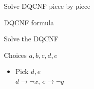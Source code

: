 \documentclass[xcolor=table	]{beamer}
\begin{document}
\begin{frame}{Solve DQCNF piece by piece}
\begin{alertblock}{DQCNF formula}
{}
\end{alertblock}

\begin{exampleblock}{Solve the DQCNF}
	{    {Choices $a, b, c, d, e$}
		\pause \pause
		\begin{itemize}
		\only \item Pick $d, e$\\
		\pause 
		  $d \to \neg x$, $e \to \neg y$ \newline 
		\pause   
		\end{itemize}
	}
\end{exampleblock}

\end{frame}
\end{document}
